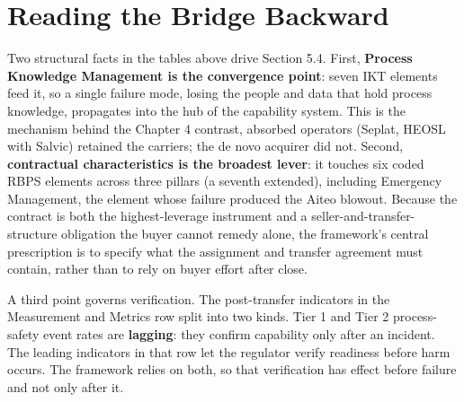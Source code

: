 \documentclass[twoside,fontset=lmodern]{mitthesis}
\begin{document}
\hypertarget{reading-the-bridge-backward}{%
\section{Reading the Bridge
Backward}\label{reading-the-bridge-backward}}

Two structural facts in the tables above drive Section 5.4. First,
\textbf{Process Knowledge Management is the convergence point}: seven
IKT elements feed it, so a single failure mode, losing the people and
data that hold process knowledge, propagates into the hub of the
capability system. This is the mechanism behind the Chapter 4 contrast,
absorbed operators (Seplat, HEOSL with Salvic) retained the carriers;
the de novo acquirer did not. Second, \textbf{contractual
characteristics is the broadest lever}: it touches six coded RBPS
elements across three pillars (a seventh extended), including Emergency
Management, the element whose failure produced the Aiteo blowout.
Because the contract is both the highest-leverage instrument and a
seller-and-transfer-structure obligation the buyer cannot remedy alone,
the framework's central prescription is to specify what the assignment
and transfer agreement must contain, rather than to rely on buyer effort
after close.

A third point governs verification. The post-transfer indicators in the
Measurement and Metrics row split into two kinds. Tier 1 and Tier 2
process-safety event rates are \textbf{lagging}: they confirm capability
only after an incident. The leading indicators in that row let the
regulator verify readiness before harm occurs. The framework relies on
both, so that verification has effect before failure and not only after
it.


\nocite{*}
\printbibliography[title={References},heading=bibintoc]
\end{document}

